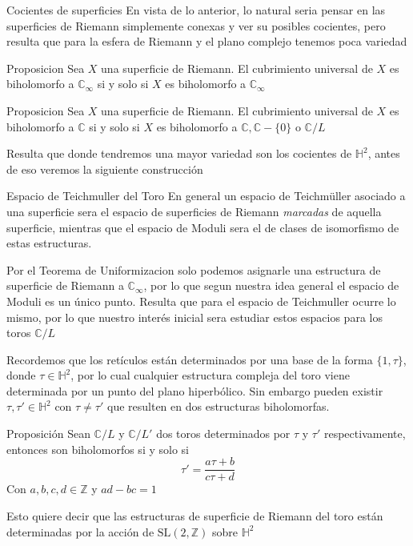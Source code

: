\documentclass[xcolor=dvipsnames,10pt]{beamer}
\newcommand\Z{\ensuremath{\mathbb{Z}}}
\newcommand\C{\ensuremath{\mathbb{C}}}
\newcommand\Hs{\ensuremath{\mathbb{H}}}
\begin{document}
\begin{frame}{Cocientes de superficies}
    En vista de lo anterior, lo natural seria pensar en las superficies de Riemann simplemente conexas y ver su posibles cocientes, pero resulta que para la esfera de Riemann y el plano complejo tenemos poca variedad
    \begin{block}{Proposicion}
        Sea $X$ una superficie de Riemann. El cubrimiento universal de $X$ es biholomorfo a $\C_\infty$ si y solo si $X$ es biholomorfo a $\C_\infty$
    \end{block}
    \begin{block}{Proposicion}
        Sea $X$ una superficie de Riemann. El cubrimiento universal de $X$ es biholomorfo a $\C$ si y solo si $X$ es biholomorfo a $\C,\C-\{0\}$ o $\C/L$
    \end{block}
    Resulta que donde tendremos una mayor variedad son los cocientes de $\Hs^2$, antes de eso veremos la siguiente construcción
\end{frame}
\begin{frame}{Espacio de Teichmuller del Toro}
    En general un espacio de Teichmüller asociado a una superficie sera el espacio de superficies de Riemann \textit{marcadas} de aquella superficie, mientras que el espacio de Moduli sera el de clases de isomorfismo de estas estructuras.\\
    \vspace{0.5cm}

    Por el Teorema de Uniformizacion solo podemos asignarle una estructura de superficie de Riemann a $\C_\infty$, por lo que segun nuestra idea general el espacio de Moduli es un único punto. Resulta que para el espacio de Teichmuller ocurre lo mismo, por lo que nuestro interés inicial sera estudiar estos espacios para los toros $\C/L$
\end{frame}
\begin{frame}{}
    Recordemos que los retículos están determinados por una base de la forma $\{1,\tau\}$, donde $\tau\in \Hs^2$, por lo cual cualquier estructura compleja del toro viene determinada por un punto del plano hiperbólico. Sin embargo pueden existir $\tau, \tau' \in \Hs^2$ con $\tau \neq \tau'$ que resulten en dos estructuras biholomorfas.

    \begin{block}{Proposición}
        Sean $\C/L$ y $\C/L'$ dos toros determinados por $\tau$ y $\tau'$ respectivamente, entonces son biholomorfos si y solo si
        \[
            \tau' = \frac{a\tau + b}{c\tau + d}
        \]
        Con $a,b,c,d \in \Z$ y $ad-bc=1$
    \end{block}

    Esto quiere decir que las estructuras de superficie de Riemann del toro están determinadas por la acción de $\text{SL}(2,\Z)$ sobre $\Hs^2$
\end{frame}
\end{document}
